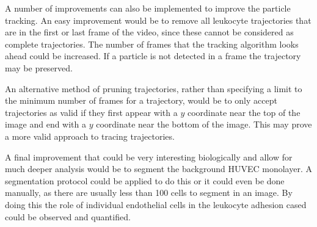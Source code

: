 A number of improvements can also be implemented to improve the particle tracking. An easy improvement would be to remove all leukocyte trajectories that are in the first or last frame of the video, since these cannot be considered as complete trajectories. The number of frames that the tracking algorithm looks ahead could be increased. If a particle is not detected in a frame the trajectory may be preserved.

An alternative method of pruning trajectories, rather than specifying a limit to the minimum number of frames for a trajectory, would be to only accept trajectories as valid if they first appear with a $y$ coordinate near the top of the image and end with a $y$ coordinate near the bottom of the image. This may prove a more valid approach to tracing trajectories.

A final improvement that could be very interesting biologically and allow for much deeper analysis would be to segment the background HUVEC monolayer. A segmentation protocol could be applied to do this or it could even be done manually, as there are usually less than 100 cells to segment in an image. By doing this the role of individual endothelial cells in the leukocyte adhesion cased could be observed and quantified. 

